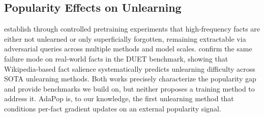 \subsection{Popularity Effects on Unlearning}
\label{subsec:popularity_effects}

\citet{krishnannot} establish through controlled pretraining experiments that high-frequency facts are either not unlearned or only superficially forgotten, remaining extractable via adversarial queries across multiple methods and model scales. \citet{anna2026anatomy} confirm the same failure mode on real-world facts in the DUET benchmark, showing that Wikipedia-based fact salience systematically predicts unlearning difficulty across SOTA unlearning methods. Both works precisely characterize the popularity gap and provide benchmarks we build on, but neither proposes a training method to address it. AdaPop is, to our knowledge, the first unlearning method that conditions per-fact gradient updates on an external popularity signal.







